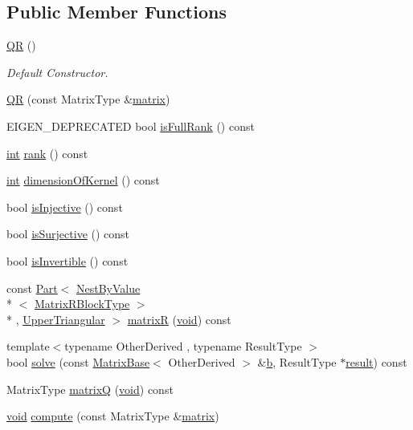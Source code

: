 \subsection*{Public Member Functions}
\begin{DoxyCompactItemize}
\item 
\hyperlink{class_q_r_a80f6a7e975cad2f0da4c739c7b8ca5ca}{Q\-R} ()
\begin{DoxyCompactList}\small\item\em Default Constructor. \end{DoxyCompactList}\item 
\hyperlink{class_q_r_aad4beb5daa7fdae87269d73c4021db8c}{Q\-R} (const Matrix\-Type \&\hyperlink{glext_8h_a7b24a3f2f56eb1244ae69dacb4fecb6f}{matrix})
\item 
E\-I\-G\-E\-N\-\_\-\-D\-E\-P\-R\-E\-C\-A\-T\-E\-D bool \hyperlink{class_q_r_a2dbe5c6dea263df251ad1a7be456974b}{is\-Full\-Rank} () const 
\item 
\hyperlink{ioapi_8h_a787fa3cf048117ba7123753c1e74fcd6}{int} \hyperlink{class_q_r_ab918ca54c3bab425ce3502585d6ba58b}{rank} () const 
\item 
\hyperlink{ioapi_8h_a787fa3cf048117ba7123753c1e74fcd6}{int} \hyperlink{class_q_r_a8a17706a983ffb985bad013fd30d3f8c}{dimension\-Of\-Kernel} () const 
\item 
bool \hyperlink{class_q_r_ae7fc820eef6b7acd548d71c8cc5081a3}{is\-Injective} () const 
\item 
bool \hyperlink{class_q_r_a9d519c0456262788b18295e771de1843}{is\-Surjective} () const 
\item 
bool \hyperlink{class_q_r_a66fea504cf14cb4274e02e1fc2bb6292}{is\-Invertible} () const 
\item 
const \hyperlink{class_part}{Part}$<$ \hyperlink{class_nest_by_value}{Nest\-By\-Value}\\*
$<$ \hyperlink{class_q_r_a91f032a54dbe9fd7ba2351326b6d1f13}{Matrix\-R\-Block\-Type} $>$\\*
, \hyperlink{_constants_8h_a96ca999d353b2e4ed0976aab836d047a}{Upper\-Triangular} $>$ \hyperlink{class_q_r_a2683f9518da6882eb0242df8072afb2a}{matrix\-R} (\hyperlink{group___u_a_v_objects_plugin_ga444cf2ff3f0ecbe028adce838d373f5c}{void}) const 
\item 
{\footnotesize template$<$typename Other\-Derived , typename Result\-Type $>$ }\\bool \hyperlink{class_q_r_ab48e3aae2e9a9cf8c466adfad97c1b13}{solve} (const \hyperlink{class_matrix_base}{Matrix\-Base}$<$ Other\-Derived $>$ \&\hyperlink{glext_8h_a6eba317e3cf44d6d26c04a5a8f197dcb}{b}, Result\-Type $\ast$\hyperlink{qxtslotjob_8h_aab161efab0511ea9612b64c40e9852ca}{result}) const 
\item 
Matrix\-Type \hyperlink{class_q_r_a542f22821457dae1626175a81a4372de}{matrix\-Q} (\hyperlink{group___u_a_v_objects_plugin_ga444cf2ff3f0ecbe028adce838d373f5c}{void}) const 
\item 
\hyperlink{group___u_a_v_objects_plugin_ga444cf2ff3f0ecbe028adce838d373f5c}{void} \hyperlink{class_q_r_ab9a457d45dab9033b09ab6825ce01a91}{compute} (const Matrix\-Type \&\hyperlink{glext_8h_a7b24a3f2f56eb1244ae69dacb4fecb6f}{matrix})
\end{DoxyCompactItemize}
